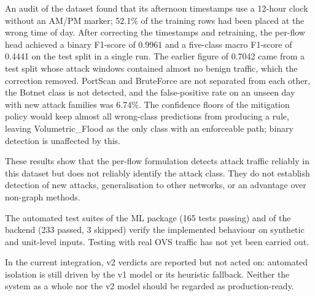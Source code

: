 \documentclass[12pt,a4paper]{report}
\begin{document}
\begin{justify}
An audit of the dataset found that its afternoon timestamps use a 12-hour clock without an AM/PM marker; 52.1\% of the training rows had been placed at the wrong time of day. After correcting the timestamps and retraining, the per-flow head achieved a binary F1-score of 0.9961 and a five-class macro F1-score of 0.4441 on the test split in a single run. The earlier figure of 0.7042 came from a test split whose attack windows contained almost no benign traffic, which the correction removed. PortScan and BruteForce are not separated from each other, the Botnet class is not detected, and the false-positive rate on an unseen day with new attack families was 6.74\%. The confidence floors of the mitigation policy would keep almost all wrong-class predictions from producing a rule, leaving Volumetric\_Flood as the only class with an enforceable path; binary detection is unaffected by this.

These results show that the per-flow formulation detects attack traffic reliably in this dataset but does not reliably identify the attack class. They do not establish detection of new attacks, generalisation to other networks, or an advantage over non-graph methods.

The automated test suites of the ML package (165 tests passing) and of the backend (233 passed, 3 skipped) verify the implemented behaviour on synthetic and unit-level inputs. Testing with real OVS traffic has not yet been carried out.

In the current integration, v2 verdicts are reported but not acted on: automated isolation is still driven by the v1 model or its heuristic fallback. Neither the system as a whole nor the v2 model should be regarded as production-ready.
\end{justify}
\end{document}
